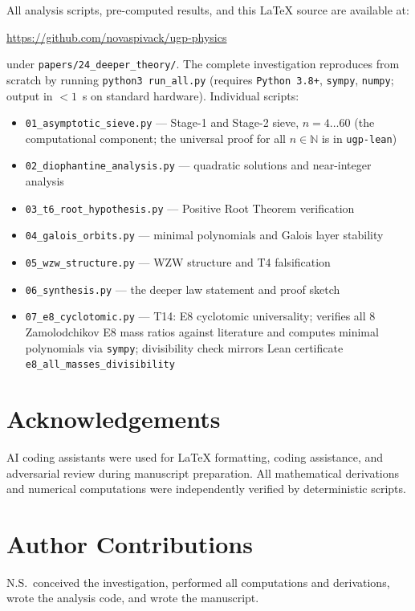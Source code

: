 \documentclass[11pt]{article}
\theoremstyle{remark}
\begin{document}
All analysis scripts, pre-computed results, and this \LaTeX{} source are available at:
\begin{center}
\url{https://github.com/novaspivack/ugp-physics}
\end{center}
under \texttt{papers/24\_deeper\_theory/}.
The complete investigation reproduces from scratch by running
\texttt{python3 run\_all.py} (requires \texttt{Python\,3.8+}, \texttt{sympy},
\texttt{numpy}; output in $<1$~s on standard hardware).
Individual scripts:
\begin{itemize}[leftmargin=1.5em,itemsep=0pt]
  \item \texttt{01\_asymptotic\_sieve.py} --- Stage-1 and Stage-2 sieve, $n = 4\ldots 60$ (the computational component; the universal proof for all $n\in\mathbb{N}$ is in \texttt{ugp-lean})
  \item \texttt{02\_diophantine\_analysis.py} --- quadratic solutions and near-integer analysis
  \item \texttt{03\_t6\_root\_hypothesis.py} --- Positive Root Theorem verification
  \item \texttt{04\_galois\_orbits.py} --- minimal polynomials and Galois layer stability
  \item \texttt{05\_wzw\_structure.py} --- WZW structure and T4 falsification
  \item \texttt{06\_synthesis.py} --- the deeper law statement and proof sketch
  \item \texttt{07\_e8\_cyclotomic.py} --- T14: E8 cyclotomic universality; verifies all 8 Zamolodchikov E8 mass ratios against literature and computes minimal polynomials via \texttt{sympy}; divisibility check mirrors Lean certificate \texttt{e8\_all\_masses\_divisibility}
\end{itemize}

\section*{Acknowledgements}
AI coding assistants were used for LaTeX formatting, coding assistance, and adversarial review during manuscript preparation. All mathematical derivations and numerical computations were independently verified by deterministic scripts.

\section*{Author Contributions}
N.S.\ conceived the investigation, performed all computations and derivations,
wrote the analysis code, and wrote the manuscript.
\end{document}
